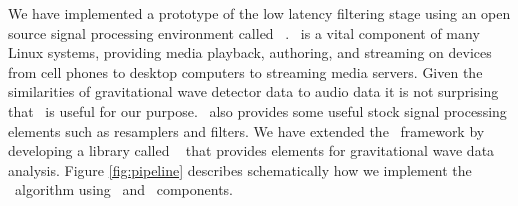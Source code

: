 We have implemented a prototype of the low latency filtering stage using an
open source signal processing environment called \gstreamer\ \cite{gstreamer}.
\gstreamer\ is a vital component of many Linux systems, providing media
playback, authoring, and streaming on devices from cell phones to desktop
computers to streaming media servers.  Given the similarities of gravitational
wave detector data to audio data it is not surprising that \gstreamer\ is
useful for our purpose. \gstreamer\ also provides some useful stock signal
processing elements such as resamplers and filters.  We have extended the
\gstreamer\ framework by developing a library called \gstlal{}~\cite{gstlal}
that provides elements for gravitational wave data analysis.  Figure
\ref{fig:pipeline} describes schematically how we implement the \lloid\ algorithm
using \gstlal\ and \gstreamer\ components.
%
%
